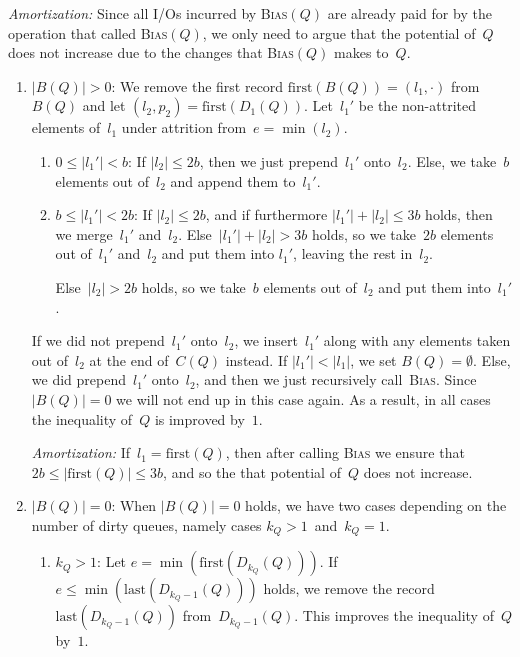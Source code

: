 \documentclass[]{article}
\newcommand{\first}{\text{first}}
\newcommand{\last}{\text{last}}
\begin{document}
\noindent \textit{Amortization:} Since all I/Os incurred by \textsc{Bias}$(Q)$
are already paid for by the operation that called \textsc{Bias}$(Q)$, we only
need to argue that the potential of~$Q$ does not increase due to the changes
that \textsc{Bias}$(Q)$ makes to~$Q$.
\begin{enumerate}[1)]
  \item \label{it:Blg0} $|B(Q)| > 0$: We remove the first record $\first(B(Q))
    =(l_1,\cdot)$ from $B(Q)$ and let $(l_2,p_2) = \first(D_1(Q))$.  Let~$l_1'$
    be the non-attrited elements of~$l_1$ under attrition from~$e = \min(l_2)$.
    \begin{enumerate}[1)]
      \item $0 \leq |l_1'| < b$: If $|l_2| \leq 2b$, then we just prepend~$l_1'$
        onto~$l_2$. Else, we take~$b$ elements out of~$l_2$ and append them
        to~$l_1'$.
    
      \item $b \leq |l_1'| < 2b$: If $|l_2| \leq 2b$, and if furthermore $|l_1'|
        + |l_2| \leq 3b$ holds, then we merge~$l_1'$ and~$l_2$. Else~$|l_1'| +
        |l_2| > 3b$ holds, so we take~$2b$ elements out of~$l_1'$ and~$l_2$ and
        put them into $l_1'$, leaving the rest in~$l_2$.
        
        Else~$|l_2| > 2b$ holds, so we take~$b$ elements out of~$l_2$ and put
        them into~$l_1'$.
    \end{enumerate}
    If we did not prepend~$l_1'$ onto~$l_2$, we insert~$l_1'$ along with any
    elements taken out of~$l_2$ at the end of~$C(Q)$ instead. If $|l_1'| <
    |l_1|$, we set $B(Q) = \emptyset$. Else, we did prepend~$l_1'$ onto~$l_2$,
    and then we just recursively call~\textsc{Bias}. Since~$|B(Q)| = 0$ we will
    not end up in this case again.  As a result, in all cases the inequality
    of~$Q$ is improved by~$1$.

    \textit{Amortization:} If~$l_1 = \first(Q)$, then after calling
    \textsc{Bias} we ensure that~$2b \leq |\first(Q)| \leq 3b$, and so the that
    potential of~$Q$ does not increase.

    \item \label{it:Beq0} $|B(Q)| = 0$: When $|B(Q)| = 0$ holds, we have two
      cases depending on the number of dirty queues, namely cases $k_Q >
      1$~and~$k_Q = 1$.
    \begin{enumerate}[1)]
      \item \label{it:KQgt1} $k_Q > 1$: Let $e = \min(\first(D_{k_Q}(Q)))$. If
        $e \leq \min(\last(D_{k_Q-1}(Q)))$ holds, we remove the record
        $\last(D_{k_Q -1}(Q))$ from~$D_{k_Q-1}(Q)$.  This improves the
        inequality of~$Q$ by~$1$.


\end{enumerate}
\end{enumerate}
\end{document}
